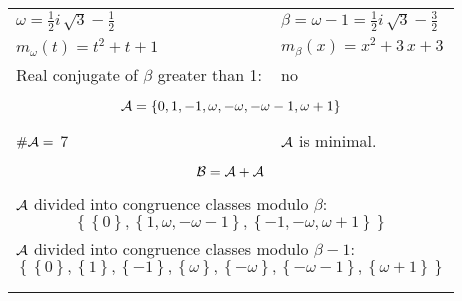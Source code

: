 \begin{exmp}
\label{ex:compareAA}


\rule{0cm}{0cm}

\begin{tabular}{ll}
$\omega=  \frac{1}{2} i \, \sqrt{3} - \frac{1}{2} $  & $\beta= \omega - 1 = \frac{1}{2} i \, \sqrt{3} - \frac{3}{2} $\\
$m_\omega(t)=  t^{2} + t + 1 $  & $m_\beta(x)=  x^{2} + 3 \, x + 3 $\\
Real conjugate of $\beta$ greater than 1:   &  no \\ \hline
\multicolumn{2}{l}{\begin{minipage}{\textwidth}\begin{dmath*}\A = \left\{0, 1, -1, \omega, -\omega, -\omega - 1, \omega + 1\right\}  \end{dmath*}\end{minipage} }\\
$\#\mathcal{A}= $ 7 $ $ & $\mathcal{A}$ is minimal. \\
\multicolumn{2}{l}{\begin{minipage}{\textwidth}\begin{dmath*}\B =\A+\A \end{dmath*}\end{minipage} }\\[10pt]
\multicolumn{2}{l}{\begin{minipage}{\textwidth}$\mathcal{A}$ divided into congruence classes modulo $\beta$: \begin{dmath*} \left\{\left\{0\right\}, \left\{1, \omega, -\omega - 1\right\}, \left\{-1, -\omega, \omega + 1\right\}\right\}  \end{dmath*}\end{minipage} }\\[10pt]
\multicolumn{2}{l}{\begin{minipage}{\textwidth}$\mathcal{A}$ divided into congruence classes modulo $\beta-1$: \begin{dmath*} \left\{\left\{0\right\}, \left\{1\right\}, \left\{-1\right\}, \left\{\omega\right\}, \left\{-\omega\right\}, \left\{-\omega - 1\right\}, \left\{\omega + 1\right\}\right\}  \end{dmath*}\end{minipage} }\\
 & \\ \hline
 & \\
\end{tabular}


\end{exmp}
